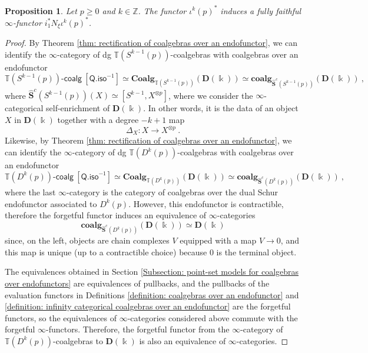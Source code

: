 \documentclass{proc-l}
\theoremstyle{plain}
\newtheorem{proposition}[{theorem}]{Proposition}
\theoremstyle{definition}
\theoremstyle{remark}
\newcommand{\kk}{\Bbbk}
\begin{document}
\begin{proposition}%
\label{Proposition:4.15}Let $p \geq 0$ and $k \in \mathbb{Z}$. The functor $\iota^k(p)^*$ induces a fully faithful $\infty$-functor $i_1^*N_{\xi}\iota^k(p)^*$.
\end{proposition}

\begin{proof}
By Theorem \ref{thm: rectification of coalgebras over an endofunctor}, we can identify the $\infty$-category of dg $\mathbb{T}(S^{k-1}(p))$-coalgebras with coalgebras over an endofunctor
\[
\mathbb{T}(S^{k-1}(p))\text{-}\mathsf{coalg}~[\mathsf{Q.iso}^{-1}] \simeq \mathbf{Coalg}_{\mathbb{T}(S^{k-1}(p))}(\mathbf{D}(\kk)) \simeq \mathbf{coalg}_{\widehat{\mathbf{S}}^c(S^{k-1}(p))}(\mathbf{D}(\kk))~,
\]
where $\widehat{\mathbf{S}}^c(S^{k-1}(p))(X) \simeq [S^{k-1}, X^{\otimes p}]$, where we consider the $\infty$-categorical self-enrichment of $\mathbf{D}(\kk)$. In other words, it is the data of an object $X$ in $\mathbf{D}(\kk)$ together with a degree $-k+1$ map
\[
\Delta_X: X \longrightarrow X^{\otimes p}~.
\]
Likewise, by Theorem \ref{thm: rectification of coalgebras over an endofunctor}, we can identify the $\infty$-category of dg $\mathbb{T}(D^{k}(p))$-coalgebras with coalgebras over an endofunctor
\[
\mathbb{T}(D^{k}(p))\text{-}\mathsf{coalg}~[\mathsf{Q.iso}^{-1}] \simeq \mathbf{Coalg}_{\mathbb{T}(D^{k}(p))}(\mathbf{D}(\kk)) \simeq \mathbf{coalg}_{\widehat{\mathbf{S}}^c(D^{k}(p))}(\mathbf{D}(\kk))~,
\]
where the last $\infty$-category is the category of coalgebras over the dual Schur endofunctor associated to $D^{k}(p)$. However, this endofunctor is contractible, therefore the forgetful functor induces an equivalence of $\infty$-categories
\[
\mathbf{coalg}_{\widehat{\mathbf{S}}^c(D^{k}(p))}(\mathbf{D}(\kk)) \simeq \mathbf{D}(\kk)
\]
since, on the left, objects are chain complexes $V$ equipped with a map $V \longrightarrow 0$, and this map is unique (up to a contractible choice) because $0$ is the terminal object.

The equivalences obtained in Section \ref{Subsection: point-set models for coalgebras over endofunctors} are equivalences of pullbacks, and the pullbacks of the evaluation functors in Definitions \ref{definition: coalgebras over an endofunctor} and \ref{definition: infinity categorical coalgebras over an endofunctor} are the forgetful functors, so the equivalences of $\infty$-categories considered above commute with the forgetful $\infty$-functors. Therefore, the forgetful functor from the $\infty$-category of $\mathbb{T}(D^{k}(p))$-coalgebras to $\mathbf{D}(\kk)$ is also an equivalence of $\infty$-categories.


\end{proof}
\end{document}
